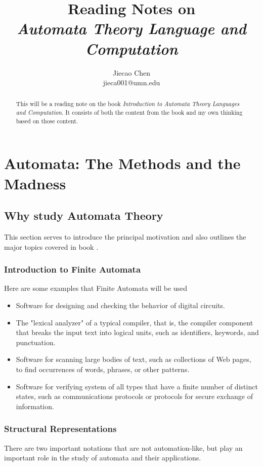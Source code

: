 \documentclass[12pt,reqno]{amsart}
\begin{document}
\title[Short version of title]{Reading Notes on \\ \small \emph{Automata Theory Language and Computation}}
\author{Jiecao Chen \\ \tiny jieca001@umn.edu }

\maketitle
\begin{abstract}
This will be a reading note on the book \textit{Introduction to Automata Theory Languages and Computation}. It consists of both the content from the book and my own thinking based on those content. 
\end{abstract}
\tableofcontents

\section{Automata: The Methods and the Madness}
\subsection{Why study Automata Theory}
This section serves to introduce the principal motivation and also outlines the major topics covered in book \cite{book1}.

\subsubsection{Introduction to Finite Automata}
Here are some examples that Finite Automata will be used
\begin{itemize}
	\item Software for designing and checking the behavior of digital circuits.
	\item The "lexical analyzer" of a typical compiler, that is, the compiler component that breaks the input text into logical units, such as identifiers, keywords, and punctuation.
	\item Software for scanning large bodies of text, such as collections of Web pages, to find occurrences of words, phrases, or other patterns.
	\item Software for verifying system of all types that have a finite number of distinct states, such as communications protocols or protocols for secure exchange of information.
\end{itemize}

\subsubsection{Structural Representations}
There are two important notations that are not automation-like, but play an important role in the study of automata and their applications.
\end{document}

